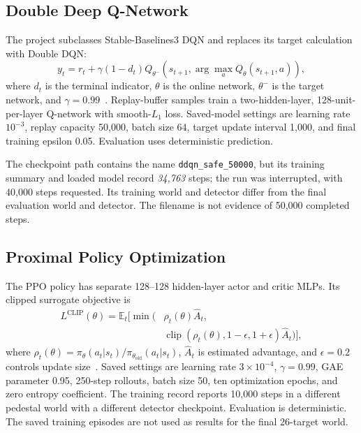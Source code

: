 \documentclass[conference]{IEEEtran}
\begin{document}
\subsection{Double Deep Q-Network}
The project subclasses Stable-Baselines3 DQN and replaces its target calculation with Double DQN:
\begin{equation}
y_t=r_t+\gamma(1-d_t)Q_{\theta^-}
\!\left(s_{t+1},\arg\max_a Q_\theta(s_{t+1},a)\right),
\label{eq:ddqn}
\end{equation}
where $d_t$ is the terminal indicator, $\theta$ is the online network, $\theta^-$ is the target network, and $\gamma=0.99$~\cite{vanhasselt2016}. Replay-buffer samples train a two-hidden-layer, 128-unit-per-layer Q-network with smooth-$L_1$ loss. Saved-model settings are learning rate $10^{-3}$, replay capacity 50,000, batch size 64, target update interval 1,000, and final training epsilon 0.05. Evaluation uses deterministic prediction.

The checkpoint path contains the name \texttt{ddqn\_safe\_50000}, but its training summary and loaded model record \emph{34,763} steps; the run was interrupted, with 40,000 steps requested. Its training world and detector differ from the final evaluation world and detector. The filename is not evidence of 50,000 completed steps.

\subsection{Proximal Policy Optimization}
The PPO policy has separate 128--128 hidden-layer actor and critic MLPs. Its clipped surrogate objective is
\begin{equation}
\begin{aligned}
L^{\mathrm{CLIP}}(\theta)=\mathbb{E}_t\bigl[\min\bigl(
&\rho_t(\theta)\hat A_t,\\
&\operatorname{clip}(\rho_t(\theta),1-\epsilon,1+\epsilon)
\hat A_t\bigr)\bigr],
\end{aligned}
\label{eq:ppo}
\end{equation}
where $\rho_t(\theta)=\pi_\theta(a_t|s_t)/
\pi_{\theta_{\mathrm{old}}}(a_t|s_t)$, $\hat A_t$ is estimated advantage, and $\epsilon=0.2$ controls update size~\cite{schulman2017}. Saved settings are learning rate $3\times10^{-4}$, $\gamma=0.99$, GAE parameter 0.95, 250-step rollouts, batch size 50, ten optimization epochs, and zero entropy coefficient. The training record reports 10,000 steps in a different pedestal world with a different detector checkpoint. Evaluation is deterministic. The saved training episodes are not used as results for the final 26-target world.
\end{document}
